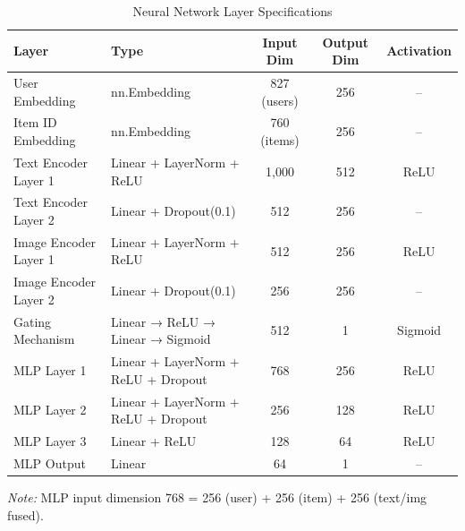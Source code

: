\begin{table}[htbp]
\centering
\small
\caption{Neural Network Layer Specifications}
\label{tab:layer_config}
\begin{tabular}{llccc}
\toprule
\textbf{Layer} & \textbf{Type} & \textbf{Input Dim} & \textbf{Output Dim} & \textbf{Activation} \\
\midrule
User Embedding & nn.Embedding & 827 (users) & 256 & -- \\
Item ID Embedding & nn.Embedding & 760 (items) & 256 & -- \\
\midrule
Text Encoder Layer 1 & Linear + LayerNorm + ReLU & 1,000 & 512 & ReLU \\
Text Encoder Layer 2 & Linear + Dropout(0.1) & 512 & 256 & -- \\
\midrule
Image Encoder Layer 1 & Linear + LayerNorm + ReLU & 512 & 256 & ReLU \\
Image Encoder Layer 2 & Linear + Dropout(0.1) & 256 & 256 & -- \\
\midrule
Gating Mechanism & Linear → ReLU → Linear → Sigmoid & 512 & 1 & Sigmoid \\
\midrule
MLP Layer 1 & Linear + LayerNorm + ReLU + Dropout & 768 & 256 & ReLU \\
MLP Layer 2 & Linear + LayerNorm + ReLU + Dropout & 256 & 128 & ReLU \\
MLP Layer 3 & Linear + ReLU & 128 & 64 & ReLU \\
MLP Output & Linear & 64 & 1 & -- \\
\bottomrule
\end{tabular}
\end{table}

\vspace{0.5em}
\textit{Note:} MLP input dimension 768 = 256 (user) + 256 (item) + 256 (text/img fused).

